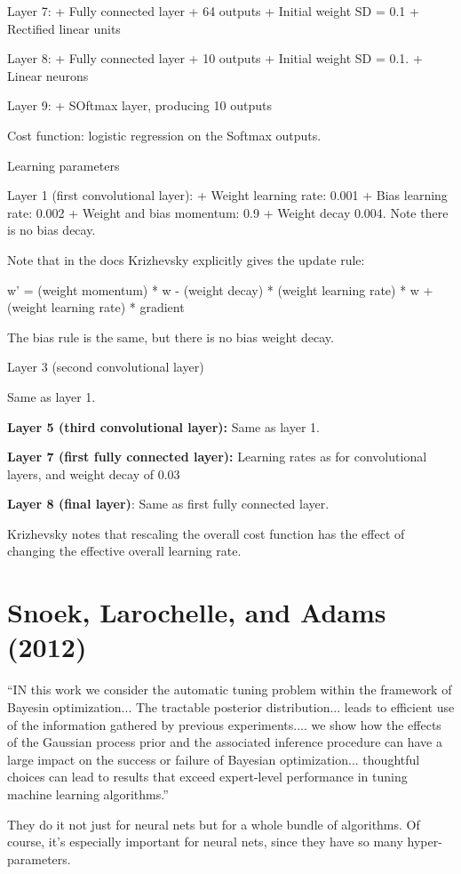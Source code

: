 \documentclass[12pt]{report}
\begin{document}
Layer 7:
+ Fully connected layer
+ 64 outputs
+ Initial weight SD = 0.1
+ Rectified linear units

Layer 8:
+ Fully connected layer
+ 10 outputs
+ Initial weight SD = 0.1.
+ Linear neurons

Layer 9:
+ SOftmax layer, producing 10 outputs

Cost function: logistic regression on the Softmax outputs.


Learning parameters

Layer 1 (first convolutional layer):
+ Weight learning rate: 0.001
+ Bias learning rate: 0.002
+ Weight and bias momentum: 0.9
+ Weight decay 0.004.  Note there is no bias decay.

Note that in the docs Krizhevsky explicitly gives the update rule:

w' = (weight momentum) * w - (weight decay) * (weight learning rate) * w
+ (weight learning rate) * gradient

The bias rule is the same, but there is no bias weight decay.


Layer 3 (second convolutional layer)

Same as layer 1.

\textbf{Layer 5 (third convolutional layer):} Same as layer 1.


\textbf{Layer 7 (first fully connected layer):} Learning rates as for
convolutional layers, and weight decay of 0.03

\textbf{Layer 8 (final layer)}: Same as first fully connected layer.

Krizhevsky notes that rescaling the overall cost function has the
effect of changing the effective overall learning rate.

\section{Snoek, Larochelle, and Adams (2012)}

``IN this work we consider the automatic tuning problem within the
framework of Bayesin optimization... The tractable posterior
distribution... leads to efficient use of the information gathered by
previous experiments.... we show how the effects of the Gaussian
process prior and the associated inference procedure can have a large
impact on the success or failure of Bayesian
optimization... thoughtful choices can lead to results that exceed
expert-level performance in tuning machine learning algorithms.''

They do it not just for neural nets but for a whole bundle of
algorithms.  Of course, it's especially important for neural nets,
since they have so many hyper-parameters.
\end{document}
